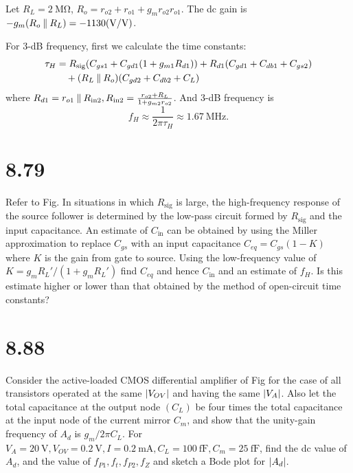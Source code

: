 \documentclass[12pt, a4paper]{article}
\begin{document}
\Ans \\
Let $R_L = \SI{2}{\Mohm}$, $R_o = r_{o2} + r_{o1} + g_mr_{o2}r_{o1}$.
The dc gain is $-g_m (R_o \paral R_L) = -1130 (\si{\V/\V})$.

For 3-dB frequency, first we calculate the time constants:
\begin{align*}
  \tau_{H} &= R_\text{sig} (C_{gs1} + C_{gd1}(1+g_{m1}R_{d1}))
  + R_{d1}(C_{gd1} + C_{db1} + C_{gs2}) \\
  & \quad + (R_L \mathbin{\|} R_o) (C_{gd2} + C_{db2} + C_L)
\end{align*}
where $R_{d1} = r_{o1} \mathbin{\|} R_\text{in2}, R_\text{in2} =
\frac{r_{o2}+R_L}{1+g_{m2}r_{o2}}$.
And 3-dB frequency is
\[
  f_H \approx \frac{1}{2\pi \tau_H} \approx \SI{1.67}{\MHz}.
\]

\section{8.79}
Refer to Fig. In situations in which $R_{\text{sig}}$ is large, the
high-frequency response of the source follower is determined by the low-pass
circuit formed by $R_{\text{sig}}$ and the input capacitance. An estimate
of $C_{\text{in}}$ can be obtained by using the Miller approximation to
replace $C_{gs}$ with an input capacitance $C_{eq} = C_{gs}(1-K)$ where $K$
is the gain from gate to source. Using the low-frequency value of
$K = g_mR_L'/(1+g_mR_L')$ find $C_{eq}$ and hence $C_{\text{in}}$ and an
estimate of $f_H$. Is this estimate higher or lower than that obtained by the
method of open-circuit time constants?

\section{8.88}
Consider the active-loaded CMOS differential amplifier of Fig for
the case of all transistors operated at the same $\lvert V_{OV}\rvert$ and having
the same $\lvert V_A\rvert$. Also let the total capacitance at the output node
$(C_L)$ be four times the total capacitance at the input node of the
current mirror $C_m$, and show that the unity-gain frequency of $A_d$ is
$g_m/2\pi C_L$. For $V_A=\SI{20}{\V}, V_{OV}=\SI{0.2}{\V}, I=\SI{0.2}{\mA},
C_L=\SI{100}{\fF},C_m=\SI{25}{\fF}$, find the dc value of $A_d$, and the
value of $f_{P1}, f_t, f_{P2}, f_Z$ and sketch a Bode plot for $\lvert A_d\rvert$.
\end{document}
